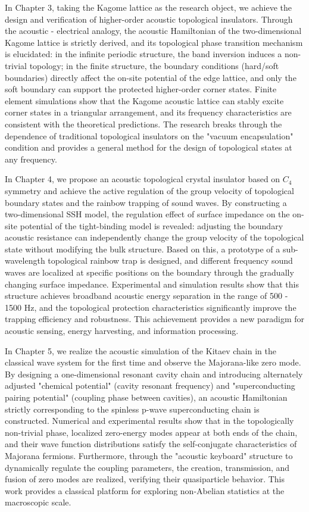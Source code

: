 \documentclass[
    type = doctor,
  ]{njuthesis}
\begin{document}
\begin{abstract*}
  In Chapter 3, taking the Kagome lattice as the research object, we achieve the design and verification of higher-order acoustic topological insulators. Through the acoustic - electrical analogy, the acoustic Hamiltonian of the two-dimensional Kagome lattice is strictly derived, and its topological phase transition mechanism is elucidated: in the infinite periodic structure, the band inversion induces a non-trivial topology; in the finite structure, the boundary conditions (hard/soft boundaries) directly affect the on-site potential of the edge lattice, and only the soft boundary can support the protected higher-order corner states. Finite element simulations show that the Kagome acoustic lattice can stably excite corner states in a triangular arrangement, and its frequency characteristics are consistent with the theoretical predictions. The research breaks through the dependence of traditional topological insulators on the "vacuum encapsulation" condition and provides a general method for the design of topological states at any frequency.
  
  In Chapter 4, we propose an acoustic topological crystal insulator based on $C_4$ symmetry and achieve the active regulation of the group velocity of topological boundary states and the rainbow trapping of sound waves. By constructing a two-dimensional SSH model, the regulation effect of surface impedance on the on-site potential of the tight-binding model is revealed: adjusting the boundary acoustic resistance can independently change the group velocity of the topological state without modifying the bulk structure. Based on this, a prototype of a sub-wavelength topological rainbow trap is designed, and different frequency sound waves are localized at specific positions on the boundary through the gradually changing surface impedance. Experimental and simulation results show that this structure achieves broadband acoustic energy separation in the range of 500 - 1500 Hz, and the topological protection characteristics significantly improve the trapping efficiency and robustness. This achievement provides a new paradigm for acoustic sensing, energy harvesting, and information processing.
  
  In Chapter 5, we realize the acoustic simulation of the Kitaev chain in the classical wave system for the first time and observe the Majorana-like zero mode. By designing a one-dimensional resonant cavity chain and introducing alternately adjusted "chemical potential" (cavity resonant frequency) and "superconducting pairing potential" (coupling phase between cavities), an acoustic Hamiltonian strictly corresponding to the spinless p-wave superconducting chain is constructed. Numerical and experimental results show that in the topologically non-trivial phase, localized zero-energy modes appear at both ends of the chain, and their wave function distributions satisfy the self-conjugate characteristics of Majorana fermions. Furthermore, through the "acoustic keyboard" structure to dynamically regulate the coupling parameters, the creation, transmission, and fusion of zero modes are realized, verifying their quasiparticle behavior. This work provides a classical platform for exploring non-Abelian statistics at the macroscopic scale.
  

\end{abstract*}
\end{document}
